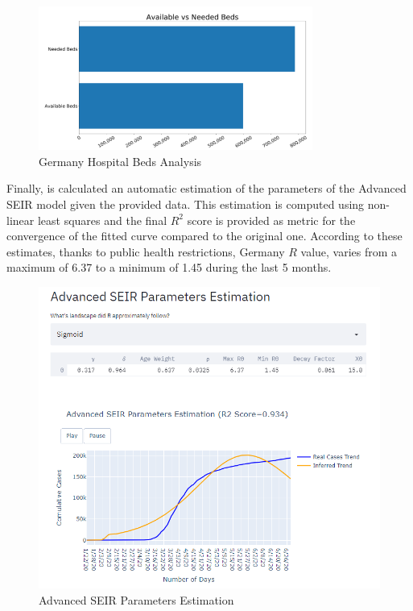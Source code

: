 \begin{figure}[ht!]%
    \centering
    \includegraphics[width=9cm]{latex/images/cov_g3.PNG}%
    \caption{Germany Hospital Beds Analysis}
    \label{germ_bed}
\end{figure}

Finally, is calculated an automatic estimation of the parameters of the Advanced SEIR model given the provided data. This estimation is computed using non-linear least squares and the final $R^{2}$ score is provided as metric for the convergence of the fitted curve compared to the original one. According to these estimates, thanks to public health restrictions, Germany $R$ value, varies from a maximum of 6.37 to a minimum of 1.45 during the last 5 months.

\begin{figure}[ht!]%
    \centering
    \includegraphics[width=13cm]{latex/images/germ_params.PNG}%
    \caption{Advanced SEIR Parameters Estimation}
\end{figure}

